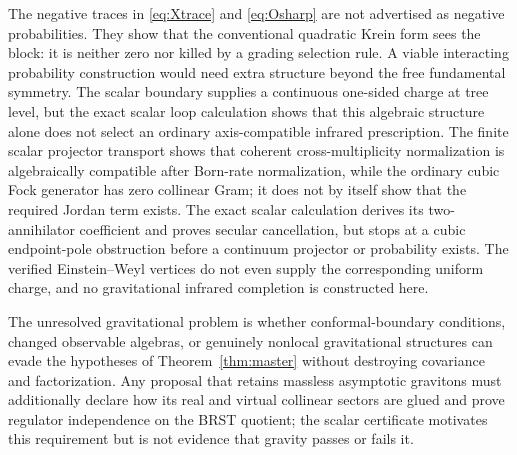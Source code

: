 \documentclass[11pt]{article}
\theoremstyle{definition}
\theoremstyle{remark}
\begin{document}
The negative traces in \eqref{eq:Xtrace} and \eqref{eq:Osharp} are not
advertised as negative probabilities.  They show that the conventional
quadratic Krein form sees the block: it is neither zero nor killed by a
grading selection rule.  A viable interacting probability construction
would need extra structure beyond the free fundamental symmetry.  The
scalar boundary supplies a continuous one-sided charge at tree level, but the
exact scalar loop calculation shows that this algebraic structure alone does
not select an ordinary axis-compatible infrared prescription.  The finite scalar
projector transport shows that coherent cross-multiplicity
normalization is algebraically compatible after Born-rate normalization,
while the ordinary cubic Fock generator has zero collinear Gram; it does not
by itself show that the required Jordan term exists.  The exact scalar
calculation derives its two-annihilator coefficient and proves secular
cancellation, but stops at a cubic endpoint-pole obstruction before a
continuum projector or probability exists.
The verified
Einstein--Weyl vertices do not even supply the corresponding uniform charge,
and no gravitational infrared completion is constructed here.

The unresolved gravitational problem is whether conformal-boundary conditions,
changed observable algebras, or genuinely nonlocal gravitational
structures can evade the hypotheses of Theorem~\ref{thm:master} without
destroying covariance and factorization.  Any proposal that retains
massless asymptotic gravitons must additionally declare how its real and
virtual collinear sectors are glued and prove regulator independence on the
BRST quotient; the scalar certificate motivates this requirement but is not
evidence that gravity passes or fails it.
\end{document}
